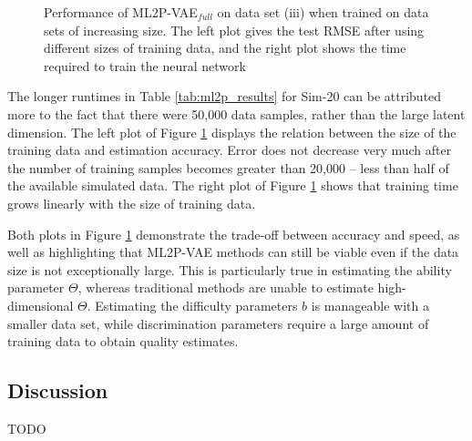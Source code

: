 \begin{figure}[h]
\begin{subfigure}{.47\textwidth}
    \end{subfigure}
    \caption{Performance of ML2P-VAE$_{full}$ on data set (iii) when trained on data sets of increasing size. The left plot gives the test RMSE after using different sizes of training data, and the right plot shows the time required to train the neural network}
    \label{fig:train_size}
\end{figure}

The longer runtimes in Table \ref{tab:ml2p_results} for Sim-20 can be attributed more to the fact that there were 50,000 data samples, rather than the large latent dimension. The left plot of Figure \ref{fig:train_size} displays the relation between the size of the training data and estimation accuracy. Error does not decrease very much after the number of training samples becomes greater than 20,000 -- less than half of the available simulated data. The right plot of Figure \ref{fig:train_size} shows that training time grows linearly with the size of training data. 

Both plots in Figure \ref{fig:train_size} demonstrate the trade-off between accuracy and speed, as well as highlighting that ML2P-VAE methods can still be viable even if the data size is not exceptionally large. This is particularly true in estimating the ability parameter $\Theta$, whereas traditional methods are unable to estimate high-dimensional $\Theta$. Estimating the difficulty parameters $b$ is manageable with a smaller data set, while discrimination parameters require a large amount of training data to obtain quality estimates.



\subsection{Discussion}
TODO %
